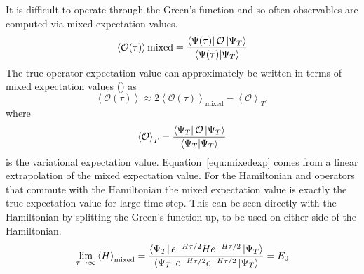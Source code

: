 It is difficult to operate through the Green's function and so often observables are computed via mixed expectation values.
\begin{equation}
   \left<\mathcal{O(\tau)}\right>\text{mixed} = \frac{\left< \Psi(\tau) \right|\mathcal{O}\left| \Psi_T \right>}{\left< \Psi(\tau) | \Psi_T \right>}
\end{equation}
The true operator expectation value can approximately be written in terms of mixed expectation values (\cite{pudliner1997}) as
\begin{equation}
   \left<\mathcal{O(\tau)}\right> \approx 2\left<\mathcal{O(\tau)}\right>_\text{mixed} - \left<\mathcal{O}\right>_T,
   \label{equ:mixedexp}
\end{equation}
where
\begin{equation}
   \left<\mathcal{O}\right>_T = \frac{\left< \Psi_T \right|\mathcal{O}\left| \Psi_T \right>}{\left< \Psi_T | \Psi_T \right>}
\end{equation}
is the variational expectation value. Equation~\ref{equ:mixedexp} comes from a linear extrapolation of the mixed expectation value. For the Hamiltonian and operators that commute with the Hamiltonian the mixed expectation value is exactly the true expectation value for large time step. This can be seen directly with the Hamiltonian by splitting the Green's function up, to be used on either side of the Hamiltonian.
\begin{equation}
   \lim\limits_{\tau\rightarrow\infty}\left<H\right>_\text{mixed} = \frac{\left< \Psi_T \right|e^{-H\tau/2}He^{-H\tau/2}\left| \Psi_T \right>}{\left< \Psi_T \right|e^{-H\tau/2}e^{-H\tau/2}\left| \Psi_T \right>} = E_0
\end{equation}

